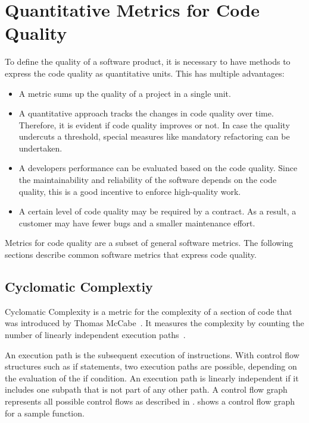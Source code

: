 \section{Quantitative Metrics for Code Quality}
To define the quality of a software product, it is necessary to have methods to express the code quality as quantitative units. This has multiple advantages:
\begin{itemize}
    \item A metric sums up the quality of a project in a single unit.
    \item A quantitative approach tracks the changes in code quality over time. Therefore, it is evident if code quality improves or not. In case the quality undercuts a threshold, special measures like mandatory refactoring can be undertaken.
    \item A developers performance can be evaluated based on the code quality. Since the maintainability and reliability of the software depends on the code quality, this is a good incentive to enforce high-quality work.
    \item A certain level of code quality may be required by a contract. As a result, a customer may have fewer bugs and a smaller maintenance effort.
\end{itemize}
Metrics for code quality are a subset of general software metrics. The following sections describe common software metrics that express code quality.

\subsection{Cyclomatic Complextiy}\label{sec:cyclomatic_complexity}
Cyclomatic Complexity is a metric for the complexity of a section of code that was introduced by Thomas McCabe~\cite{mccabe_complexity_1976}. It measures the complexity by counting the number of linearly independent execution paths~\cite{mccabe_complexity_1976}. 

An execution path is the subsequent execution of instructions. With control flow structures such as if statements, two execution paths are possible, depending on the evaluation of the if condition. An execution path is linearly independent if it includes one subpath that is not part of any other path. A control flow graph represents all possible control flows as described in .  shows a control flow graph for a sample function.

